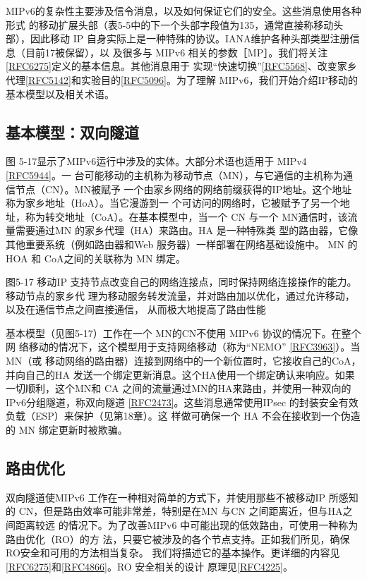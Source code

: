 MIPv6的复杂性主要涉及信令消息，以及如何保证它们的安全。这些消息使用各种形式
的移动扩展头部（表5-5中的下一个头部字段值为135，通常直接称移动头部），因此移动
IP 自身实际上是一种特殊的协议。IANA维护各种头部类型注册信息（目前17被保留），以
及很多与 MIPv6 相关的参数［MP］。我们将关注\href{https://www.rfc-editor.org/rfc/rfc6275}{[RFC6275]}定义的基本信息。其他消息用于
实现“快速切换”\href{https://www.rfc-editor.org/rfc/rfc5568}{[RFC5568]}、改变家乡代理\href{https://www.rfc-editor.org/rfc/rfc5142}{[RFC5142]}和实验目的\href{https://www.rfc-editor.org/rfc/rfc5096}{[RFC5096]}。为了理解
MIPv6，我们开始介绍IP移动的基本模型以及相关术语。

\subsection{基本模型：双向隧道}
图 5-17显示了MIPv6运行中涉及的实体。大部分术语也适用于 MIPv4 \href{https://www.rfc-editor.org/rfc/rfc5944}{[RFC5944]}。一
台可能移动的主机称为移动节点（MN），与它通信的主机称为通信节点（CN）。MN被赋予
一个由家乡网络的网络前缀获得的IP地址。这个地址称为家乡地址（HoA）。当它漫游到一
个可访问的网络时，它被赋予了另一个地址，称为转交地址（CoA）。在基本模型中，当一个
CN 与一个 MN通信时，该流量需要通过MN 的家乡代理（HA）来路由。HA 是一种特殊类
型的路由器，它像其他重要系统（例如路由器和Web 服务器）一样部署在网络基础设施中。
MN 的HOA 和 CoA之间的关联称为 MN 绑定。

图5-17 移动IP 支持节点改变自己的网络连接点，同时保持网络连接操作的能力。移动节点的家乡代
理为移动服务转发流量，并对路由加以优化，通过允许移动，以及在通信节点之间直接通信，
从而极大地提高了路由性能

基本模型（见图5-17）工作在一个 MN的CN不使用 MIPv6 协议的情况下。在整个网
络移动的情况下，这个模型用于支持网络移动（称为“NEMO” \href{https://www.rfc-editor.org/rfc/rfc3963}{[RFC3963]}）。当MN（或
移动网络的路由器）连接到网络中的一个新位置时，它接收自己的CoA，并向自己的HA
发送一个绑定更新消息。这个HA使用一个绑定确认来响应。如果一切顺利，这个MN和
CA 之间的流量通过MN的HA来路由，并使用一种双向的IPv6分组隧道，称双向隧道
\href{https://www.rfc-editor.org/rfc/rfc2473}{[RFC2473]}。这些消息通常使用IPsec 的封装安全有效负载（ESP）来保护（见第18章）。这
样做可确保一个 HA 不会在接收到一个伪造的 MN 绑定更新时被欺骗。

\subsection{路由优化}
双向隧道使MIPv6 工作在一种相对简单的方式下，并使用那些不被移动IP 所感知的
CN，但是路由效率可能非常差，特别是在MN 与CN 之间距离近，但与HA之间距离较远
的情况下。为了改善MIPv6 中可能出现的低效路由，可使用一种称为路由优化（RO）的方
法，只要它被涉及的各个节点支持。正如我们所见，确保 RO安全和可用的方法相当复杂。
我们将描述它的基本操作。更详细的内容见\href{https://www.rfc-editor.org/rfc/rfc6275}{[RFC6275]}和\href{https://www.rfc-editor.org/rfc/rfc4866}{[RFC4866]}。RO 安全相关的设计
原理见\href{https://www.rfc-editor.org/rfc/rfc4225}{[RFC4225]}。

